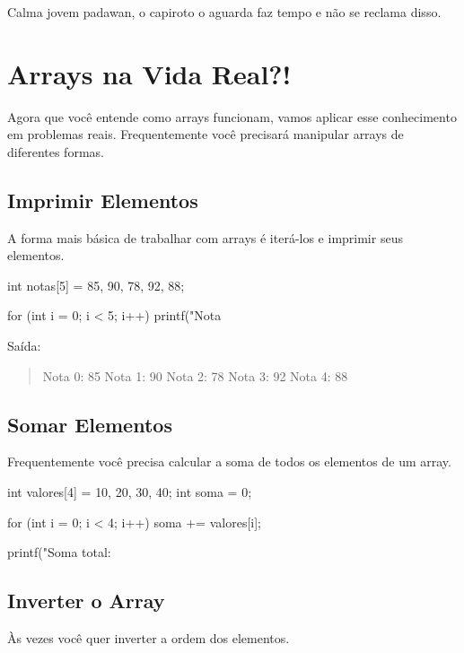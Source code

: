 
Calma jovem padawan, o capiroto o aguarda faz tempo e não se reclama disso.



\section{Arrays na Vida Real?!}

Agora que você entende como arrays funcionam, vamos aplicar esse conhecimento em problemas reais. Frequentemente você precisará manipular arrays de diferentes formas.

\subsection{Imprimir Elementos}

A forma mais básica de trabalhar com arrays é iterá-los e imprimir seus elementos.

\begin{ccode}
  int notas[5] = {85, 90, 78, 92, 88};

  for (int i = 0; i < 5; i++) {
    printf("Nota %
  }
\end{ccode}

Saída:
\begin{quote}
  Nota 0: 85
  Nota 1: 90
  Nota 2: 78
  Nota 3: 92
  Nota 4: 88
\end{quote}

\subsection{Somar Elementos}

Frequentemente você precisa calcular a soma de todos os elementos de um array.

\begin{ccode}
  int valores[4] = {10, 20, 30, 40};
  int soma = 0;

  for (int i = 0; i < 4; i++) {
    soma += valores[i];
  }

  printf("Soma total: %
\end{ccode}

\subsection{Inverter o Array}

Às vezes você quer inverter a ordem dos elementos.

